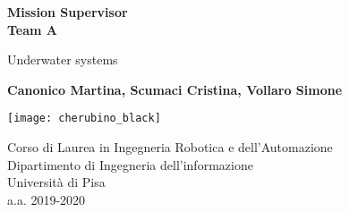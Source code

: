 \begin{center}		
	\vspace*{1cm}
	
	{\Huge
	\textbf{Mission Supervisor \\
	Team A}}
	
	\vspace{0.5cm}
	
	Underwater systems
		
	\vspace{1.5cm}



	{\large
	\textbf{Canonico Martina, Scumaci Cristina, Vollaro Simone}}

	\vfill
 
	\texttt{[image: cherubino\_black]}
		
	\vspace{0.8cm}
		
	Corso di Laurea in Ingegneria Robotica e dell'Automazione\\
	Dipartimento di Ingegneria dell'informazione\\
	Università di Pisa\\
	a.a. 2019-2020
	\thispagestyle{empty}
\end{center}
